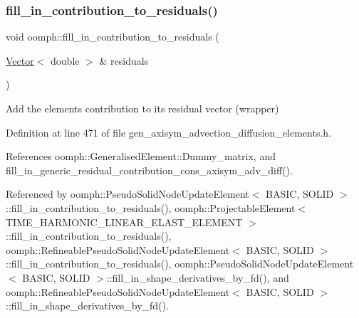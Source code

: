 \subsubsection{\texorpdfstring{fill\+\_\+in\+\_\+contribution\+\_\+to\+\_\+residuals()}{fill\_in\_contribution\_to\_residuals()}}
{\footnotesize\ttfamily void oomph\+::fill\+\_\+in\+\_\+contribution\+\_\+to\+\_\+residuals (\begin{DoxyParamCaption}\item[{\hyperlink{classoomph_1_1Vector}{Vector}$<$ double $>$ \&}]{residuals }\end{DoxyParamCaption})}



Add the element\textquotesingle{}s contribution to its residual vector (wrapper) 



Definition at line 471 of file gen\+\_\+axisym\+\_\+advection\+\_\+diffusion\+\_\+elements.\+h.



References oomph\+::\+Generalised\+Element\+::\+Dummy\+\_\+matrix, and fill\+\_\+in\+\_\+generic\+\_\+residual\+\_\+contribution\+\_\+cons\+\_\+axisym\+\_\+adv\+\_\+diff().



Referenced by oomph\+::\+Pseudo\+Solid\+Node\+Update\+Element$<$ B\+A\+S\+I\+C, S\+O\+L\+I\+D $>$\+::fill\+\_\+in\+\_\+contribution\+\_\+to\+\_\+residuals(), oomph\+::\+Projectable\+Element$<$ T\+I\+M\+E\+\_\+\+H\+A\+R\+M\+O\+N\+I\+C\+\_\+\+L\+I\+N\+E\+A\+R\+\_\+\+E\+L\+A\+S\+T\+\_\+\+E\+L\+E\+M\+E\+N\+T $>$\+::fill\+\_\+in\+\_\+contribution\+\_\+to\+\_\+residuals(), oomph\+::\+Refineable\+Pseudo\+Solid\+Node\+Update\+Element$<$ B\+A\+S\+I\+C, S\+O\+L\+I\+D $>$\+::fill\+\_\+in\+\_\+contribution\+\_\+to\+\_\+residuals(), oomph\+::\+Pseudo\+Solid\+Node\+Update\+Element$<$ B\+A\+S\+I\+C, S\+O\+L\+I\+D $>$\+::fill\+\_\+in\+\_\+shape\+\_\+derivatives\+\_\+by\+\_\+fd(), and oomph\+::\+Refineable\+Pseudo\+Solid\+Node\+Update\+Element$<$ B\+A\+S\+I\+C, S\+O\+L\+I\+D $>$\+::fill\+\_\+in\+\_\+shape\+\_\+derivatives\+\_\+by\+\_\+fd().

\mbox{\label{namespaceoomph_a7d874a2081564c9490111b5fb936e46d}} 
